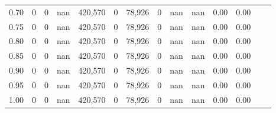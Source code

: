 \begin{tabular}{rrrrrrrrrrrrrr}
0.70 &        0 &       0 &     nan &  420,570 &        0 &  78,926 &       0 &   nan &   nan &  0.00 &      0.00 \\
0.75 &        0 &       0 &     nan &  420,570 &        0 &  78,926 &       0 &   nan &   nan &  0.00 &      0.00 \\
0.80 &        0 &       0 &     nan &  420,570 &        0 &  78,926 &       0 &   nan &   nan &  0.00 &      0.00 \\
0.85 &        0 &       0 &     nan &  420,570 &        0 &  78,926 &       0 &   nan &   nan &  0.00 &      0.00 \\
0.90 &        0 &       0 &     nan &  420,570 &        0 &  78,926 &       0 &   nan &   nan &  0.00 &      0.00 \\
0.95 &        0 &       0 &     nan &  420,570 &        0 &  78,926 &       0 &   nan &   nan &  0.00 &      0.00 \\
1.00 &        0 &       0 &     nan &  420,570 &        0 &  78,926 &       0 &   nan &   nan &  0.00 &      0.00 \\
\bottomrule
\end{tabular}
